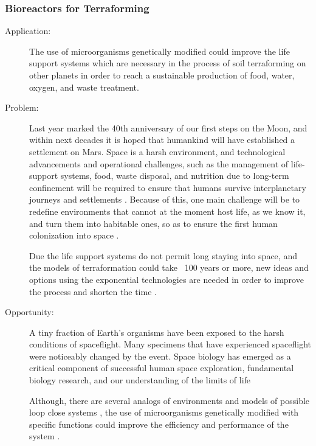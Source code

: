 \subsubsection{Bioreactors for Terraforming}
\label{bioreactors}
 
\begin{description}   \item[Application:] The use of microorganisms genetically modified  could
improve the life support systems   which are necessary in the process of
soil   terraforming on other planets in order to reach a sustainable
production  of food, water, oxygen,  and waste treatment.
 
\item[Problem:]  Last year marked  the 40th anniversary of our first steps on
the  Moon, and within next decades  it is hoped that humankind will have
established   a settlement on Mars. Space is a harsh environment, and
technological  advancements and  operational challenges, such as the
management   of life-support systems, food, waste disposal, and
nutrition  due to long-term  confinement will be required to ensure that
humans  survive interplanetary  journeys and settlements \cite{Horneck2010}. Because of   this, one main challenge will be to redefine environments that cannot at the   moment host life, as we know it, and turn them into habitable ones, so   as to ensure the first human
colonization   into space   \cite{gerlach}.
 
Due  the life support systems do  not permit long staying into space,
and  the  models of terraformation could take ~100 years or more, new
ideas  and options using the  exponential technologies are needed in
order   to improve the process and shorten the time \cite{Heppener2008}.
 
\item[Opportunity:]  A tiny  fraction of Earth’s organisms have been exposed to
the  harsh conditions of  spaceflight. Many specimens that have
experienced   spaceflight were noticeably changed by the event. Space
biology  has emerged as a critical  component of successful human space
exploration,   fundamental biology research, and our understanding of
the  limits of life \cite{Dubertret1987,Hendrickx2007}
 
Although,  there are several  analogs of environments and models of
possible   loop close systems \cite{Poughon2009}, the use of
microorganisms  genetically  modified with specific functions could
improve   the efficiency and performance of the system \cite{Kern2001}.
 

\end{description}
